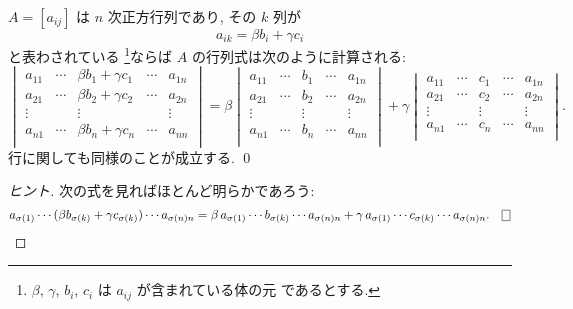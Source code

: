 \documentclass[12pt,twoside]{jarticle}
\begin{document}
\begin{question}[多重線形性]
  \label{q:multilin-det}
  $A=[a_{ij}]$ は $n$ 次正方行列であり, その $k$ 列が
  \begin{equation*}
    a_{ik} = \beta b_i + \gamma c_i
  \end{equation*}
  と表わされている%
  \footnote{$\beta$, $\gamma$, $b_i$, $c_i$ は $a_{ij}$ が含まれている体の元
    であるとする.}ならば $A$ の行列式は次のように計算される:
  {\small\begin{equation*}
    \begin{vmatrix}
      a_{11} & \cdots & \beta b_1 + \gamma c_1 & \cdots & a_{1n} \\
      a_{21} & \cdots & \beta b_2 + \gamma c_2 & \cdots & a_{2n} \\
      \vdots &        &        \vdots          &        & \vdots \\
      a_{n1} & \cdots & \beta b_n + \gamma c_n & \cdots & a_{nn} \\
    \end{vmatrix}
    =
    \beta
    \begin{vmatrix}
      a_{11} & \cdots & b_1    & \cdots & a_{1n} \\
      a_{21} & \cdots & b_2    & \cdots & a_{2n} \\
      \vdots &        & \vdots &        & \vdots \\
      a_{n1} & \cdots & b_n    & \cdots & a_{nn} \\
    \end{vmatrix}
    + \gamma
    \begin{vmatrix}
      a_{11} & \cdots & c_1    & \cdots & a_{1n} \\
      a_{21} & \cdots & c_2    & \cdots & a_{2n} \\
      \vdots &        & \vdots &        & \vdots \\
      a_{n1} & \cdots & c_n    & \cdots & a_{nn} \\
    \end{vmatrix}.
  \end{equation*}}
  行に関しても同様のことが成立する. \qed
\end{question}

\begin{proof}[ヒント]
  次の式を見ればほとんど明らかであろう:
  \begin{equation*}
    a_{\sigma(1)}\cdots
    (\beta b_{\sigma(k)}+\gamma c_{\sigma(k)})
    \cdots a_{\sigma(n)n}
    = \beta\, a_{\sigma(1)}\cdots b_{\sigma(k)}\cdots a_{\sigma(n)n}
    + \gamma\,a_{\sigma(1)}\cdots c_{\sigma(k)}\cdots a_{\sigma(n)n}.
  \qed
  \end{equation*}
\end{proof}
\end{document}
